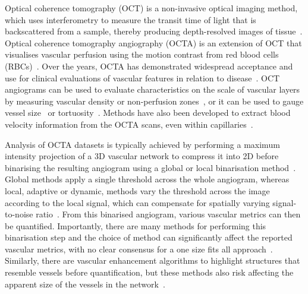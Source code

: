 \documentclass{optica-article}
\begin{document}
Optical coherence tomography (OCT) is a non-invasive optical imaging method, which uses interferometry to measure the transit time of light that is backscattered from a sample, thereby producing depth-resolved images of tissue~\cite{huangOpticalCoherenceTomography1991,fercherVivoOpticalCoherence1993}. Optical coherence tomography angiography (OCTA) is an extension of OCT that visualises vascular perfusion using the motion contrast from red blood cells (RBCs)~\cite{makitaOpticalCoherenceAngiography2006,srinivasanRapidVolumetricAngiography2010,taoSinglepassVolumetricBidirectional2008,wangThreeDimensionalOptical2007}. Over the years, OCTA has demonstrated widespread acceptance and use for clinical evaluations of vascular features in relation to disease~\cite{javedOpticalCoherenceTomography2023}. OCT angiograms can be used to evaluate characteristics on the scale of vascular layers by measuring vascular density or non-perfusion zones~\cite{tanApproachesQuantifyOptical2020,hwangVisualization3Distinct2016,coscasOpticalCoherenceTomography2016,takusagawaProjectionResolvedOptical2017,zabelComparisonRetinalMicrovasculature2019,tanApplicationOpticalCoherence2021}, or it can be used to gauge vessel size~\cite{yaoComparisonRetinalVessel2021} or tortuosity~\cite{leeQUANTIFICATIONRETINALVESSEL2018}. Methods have also been developed to extract blood velocity information from the OCTA scans, even within capillaries~\cite{choiUltrahighSpeedSweptSourceOptical2015,wangAutocorrelationOpticalCoherence2010,srinivasanOCTMethodsCapillary2012}.

Analysis of OCTA datasets is typically achieved by performing a maximum intensity projection of a 3D vascular network to compress it into 2D before binarising the resulting angiogram using a global or local binarisation method~\cite{sampsonTowardsStandardizingRetinal2022,untrachtTowardsStandardisingRetinal2024}. Global methods apply a single threshold across the whole angiogram, whereas local, adaptive or dynamic, methods vary the threshold across the image according to the local signal, which can compensate for spatially varying signal-to-noise ratio~\cite{binottiAutomatedImageThreshold2022,chuQuantificationChoriocapillarisPhansalkar2020,kimQuantifyingMicrovascularDensity2016,untrachtTowardsStandardisingRetinal2024}. From this binarised angiogram, various vascular metrics can then be quantified. Importantly, there are many methods for performing this binarisation step and the choice of method can significantly affect the reported vascular metrics, with no clear consensus for a one size fits all approach~\cite{mehtaImpactBinarizationThresholding2019,rabioloComparisonMethodsQuantify2018,borrelliOPTICALCOHERENCETOMOGRAPHY2021,freedmanImpactImageProcessing2022,arrigoImpactDifferentThresholds2021}. Similarly, there are vascular enhancement algorithms to highlight structures that resemble vessels before quantification, but these methods also risk affecting the apparent size of the vessels in the network~\cite{freedmanImpactImageProcessing2022,hongIntrasessionRepeatabilityQuantitative2020,hongEffectVesselEnhancement2020}.
\end{document}
